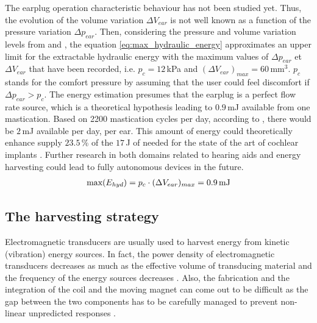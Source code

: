 \documentclass[3p,twocolumn,preprint]{elsarticle}
\begin{document}
The earplug operation characteristic behaviour has not been studied yet. Thus, the evolution of the volume variation $\Delta V_{ear}$ is not well known as a function of the pressure variation $\Delta p_{ear}$. Then, considering the pressure and volume variation levels from \cite{Delnavaz2012} and \cite{Bouchard-Roy2020}, the equation \ref{eq:max_hydraulic_energy} approximates an upper limit for the extractable hydraulic energy with the maximum values of $\Delta p_{ear}$ et $\Delta V_{ear}$ that have been recorded, i.e. $p_c=12$\,kPa and $(\Delta V_{ear})_{max}=60$\,mm$^3$. $p_c$ stands for the comfort pressure by assuming that the user could feel discomfort if $\Delta p_{ear}>p_c$. The energy estimation presumes that the earplug is a perfect flow rate source, which is a theoretical hypothesis leading to $0.9$\,mJ available from one mastication. Based on 2200 mastication cycles per day, according to \cite{Goll2011}, there would be $2$\,mJ available per day, per ear. This amount of energy could theoretically enhance supply $23.5$\,\% of the $17$\,J of needed for the state of the art of cochlear implants \cite{Kulah2022}. Further research in both domains related to hearing aids and energy harvesting could lead to fully autonomous devices in the future.
\begin{align}
	\text{max}(E_{hyd}) = p_c \cdot (\Delta V_{ear})_{max} = 0.9\text{\,mJ}
	\label{eq:max_hydraulic_energy}
\end{align}

	\subsection{The harvesting strategy}	
	\label{The harvesting strategy}
Electromagnetic transducers are usually used to harvest energy from kinetic (vibration) energy sources. In fact, the power density of electromagnetic transducers decreases as much as the effective volume of transducing material and the frequency of the energy sources decreases \cite{Priya2017,Kulah2008}. Also, the fabrication and the integration of the coil and the moving magnet can come out to be difficult as the gap between the two components has to be carefully managed to prevent non-linear unpredicted responses \cite{Caruntu2001}. 
\end{document}
